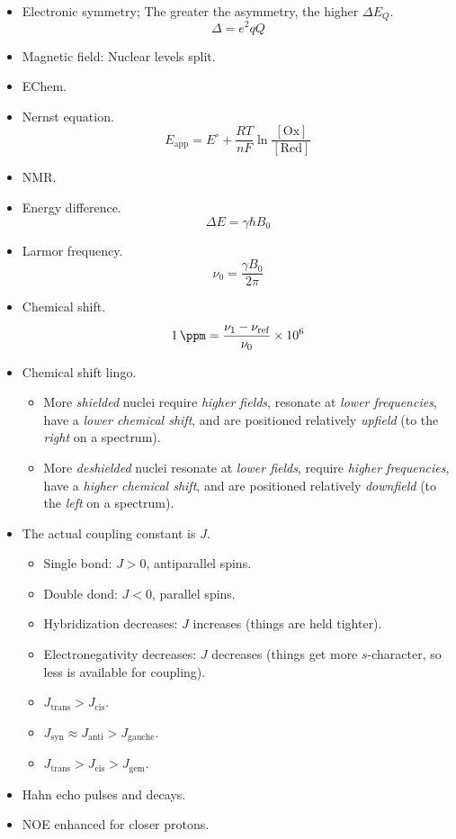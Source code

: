 \documentclass[../notes.tex]{subfiles}
\begin{document}
\begin{itemize}
    \item Electronic symmetry; The greater the asymmetry, the higher $\Delta E_Q$.
    \begin{equation*}
        \Delta = e^2qQ
    \end{equation*}
    \item Magnetic field: Nuclear levels split.
    \item EChem.
    \item Nernst equation.
    \begin{equation*}
        E_\text{app} = E^\circ+\frac{RT}{nF}\ln\frac{[\text{Ox}]}{[\text{Red}]}
    \end{equation*}
    \item NMR.
    \item Energy difference.
    \begin{equation*}
        \Delta E = \gamma\hbar B_0
    \end{equation*}
    \item Larmor frequency.
    \begin{equation*}
        \nu_0 = \frac{\gamma B_0}{2\pi}
    \end{equation*}
    \item Chemical shift.
    \begin{equation*}
        \SI{1}{\ppm} = \frac{\nu_1-\nu_\text{ref}}{\nu_0}\times\num{e6}
    \end{equation*}
    \item Chemical shift lingo.
    \begin{itemize}
        \item More \emph{shielded} nuclei require \emph{higher fields}, resonate at \emph{lower frequencies}, have a \emph{lower chemical shift}, and are positioned relatively \emph{upfield} (to the \emph{right} on a spectrum).
        \item More \emph{deshielded} nuclei resonate at \emph{lower fields}, require \emph{higher frequencies}, have a \emph{higher chemical shift}, and are positioned relatively \emph{downfield} (to the \emph{left} on a spectrum).
    \end{itemize}
    \item The actual coupling constant is $J$.
    \begin{itemize}
        \item Single bond: $J>0$, antiparallel spins.
        \item Double dond: $J<0$, parallel spins.
        \item Hybridization decreases: $J$ increases (things are held tighter).
        \item Electronegativity decreases: $J$ decreases (things get more $s$-character, so less is available for coupling).
        \item $J_\text{trans}>J_\text{cis}$.
        \item $J_\text{syn}\approx J_\text{anti}>J_\text{gauche}$.
        \item $J_\text{trans}>J_\text{cis}>J_\text{gem}$.
    \end{itemize}
    \item Hahn echo pulses and decays.
    \item NOE enhanced for closer protons.
\end{itemize}
\end{document}
